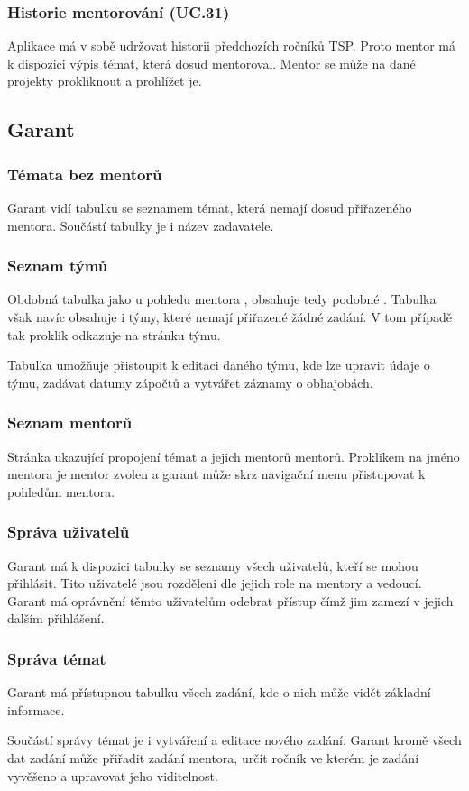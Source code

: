 \documentclass[czech,BP]{thesiskiv}
\begin{document}
			\subsubsection{Historie mentorování (UC.31)}
				\par Aplikace má v sobě udržovat historii předchozích ročníků TSP. Proto mentor má k dispozici výpis témat, která dosud mentoroval. Mentor se může na dané projekty prokliknout a prohlížet je.
		\subsection{Garant}
			\subsubsection{Témata bez mentorů}
			\par Garant vidí tabulku se seznamem témat, která nemají dosud přiřazeného mentora. Součástí tabulky je i název zadavatele.
			\subsubsection{Seznam týmů}
			\par Obdobná tabulka jako u pohledu mentora , obsahuje tedy podobné . Tabulka však navíc obsahuje i týmy, které nemají přiřazené žádné zadání. V tom případě tak proklik odkazuje na stránku týmu.
			\par Tabulka umožňuje přistoupit k editaci daného týmu, kde lze upravit údaje o týmu, zadávat datumy zápočtů a vytvářet záznamy o obhajobách.
			\subsubsection{Seznam mentorů}
			\par Stránka ukazující propojení témat a jejich mentorů mentorů. Proklikem na jméno mentora je mentor zvolen a garant může skrz navigační menu přistupovat k pohledům mentora.
			\subsubsection{Správa uživatelů}
			\par Garant má k dispozici tabulky se seznamy všech uživatelů, kteří se mohou přihlásit. Tito uživatelé jsou rozděleni dle jejich role na mentory a vedoucí. Garant má oprávnění těmto uživatelům odebrat přístup čímž jim zamezí v jejich dalším přihlášení.
			\subsubsection{Správa témat}
			\par Garant má přístupnou tabulku všech zadání, kde o nich může vidět základní informace. 
			\par Součástí správy témat je i vytváření a editace nového zadání. Garant kromě všech dat zadání může přiřadit zadání mentora, určit ročník ve kterém je zadání vyvěšeno a upravovat jeho viditelnost.
\end{document}
